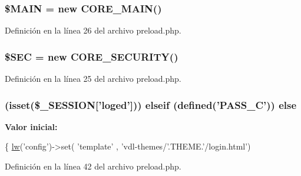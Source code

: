 \hypertarget{vdl-include_2preload_8php_aa3efd4a61925b50d9d066bd2b42dcd3d}{
\subsubsection[{\$\-M\-A\-I\-N}]{\setlength{\rightskip}{0pt plus 5cm}\$M\-A\-I\-N = new {\bf C\-O\-R\-E\-\_\-\-M\-A\-I\-N}()}}\label{vdl-include_2preload_8php_aa3efd4a61925b50d9d066bd2b42dcd3d}


Definición en la línea 26 del archivo preload.\-php.

\hypertarget{vdl-include_2preload_8php_a68aa4f40df62985576ba2fc584690b9f}{
\subsubsection[{\$\-S\-E\-C}]{\setlength{\rightskip}{0pt plus 5cm}\$S\-E\-C = new {\bf C\-O\-R\-E\-\_\-\-S\-E\-C\-U\-R\-I\-T\-Y}()}}\label{vdl-include_2preload_8php_a68aa4f40df62985576ba2fc584690b9f}


Definición en la línea 25 del archivo preload.\-php.

\hypertarget{vdl-include_2preload_8php_a967a80b79092a542d821aaf910a5ea83}{
\subsubsection[{else}]{ (isset(\$\-\_\-\-S\-E\-S\-S\-I\-O\-N\mbox{[}'loged'\mbox{]})) elseif (defined('P\-A\-S\-S\-\_\-\-C')) else}}\label{vdl-include_2preload_8php_a967a80b79092a542d821aaf910a5ea83}
{\bfseries Valor inicial\-:}
\begin{DoxyCode}
\{
        \hyperlink{core_2leafwork_8php_a471b391fa50a15b9d3e9d63d0a3dac27}{lw}(\textcolor{stringliteral}{'config'})->set( \textcolor{stringliteral}{'template'} , \textcolor{stringliteral}{'vdl-themes/'}.THEME.\textcolor{stringliteral}{'/login.html'})
\end{DoxyCode}


Definición en la línea 42 del archivo preload.\-php.


